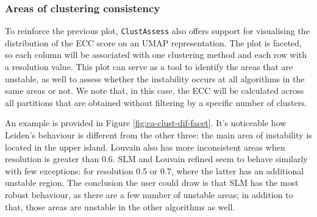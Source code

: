 \subsubsection{Areas of clustering consistency}
To reinforce the previous plot, \verb|ClustAssess| also offers support for visualising the distribution of the ECC score on an UMAP representation. The plot is faceted, so each column will be associated with one clustering method and each row with a resolution value. This plot can serve as a tool to identify the areas that are unstable, as well to assess whether the instability occurs at all algorithms in the same areas or not. We note that, in this case, the ECC will be calculated across all partitions that are obtained without filtering by a specific number of clusters.

An example is provided in Figure \ref{fig:ca-clust-dif-facet}. It's noticeable how Leiden's behaviour is different from the other three: the main area of instability is located in the upper island. Louvain also has more inconsistent areas when resolution is greater than 0.6. SLM and Louvain refined seem to behave similarly with few exceptions: for resolution 0.5 or 0.7, where the latter has an additional unstable region. The conclusion the user could draw is that SLM has the most robust behaviour, as there are a few number of unstable areas; in addition to that, those areas are unstable in the other algorithms as well.

